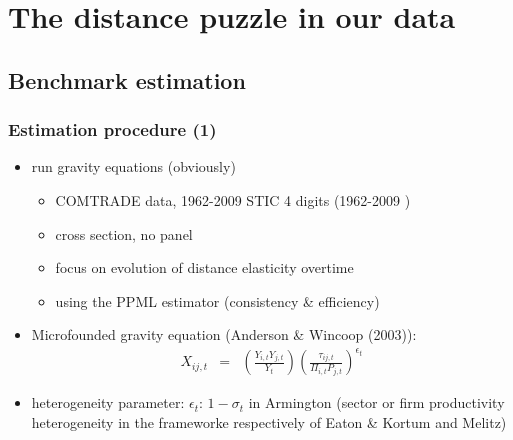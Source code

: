 \documentclass{beamer}
\begin{document}
\section{The distance puzzle in our data}
\subsection{Benchmark estimation}
\begin{frame}\frametitle{Estimation procedure (1)}
\begin{itemize}
	\item run gravity equations (obviously)
	\begin{itemize}
		\item COMTRADE data, 1962-2009 STIC 4 digits (1962-2009 )
		\item cross section, no panel
		\item focus on evolution of distance elasticity overtime
		\item using the PPML estimator (consistency \& efficiency)
	\end{itemize}
\item Microfounded gravity equation (Anderson \& Wincoop (2003)):
\begin{eqnarray}
X_{ij,t} & = & \left(\frac{Y_{i,t}Y_{j,t}}{Y_t}\right)\left(\frac{\tau_{ij,t}}{\Pi_{i,t}P_{j,t}}\right)^{\epsilon_t} \nonumber
\end{eqnarray}
\item heterogeneity parameter: $\epsilon_t$: $1-\sigma_{t}$ in Armington (sector or firm productivity heterogeneity in the frameworke respectively of Eaton \& Kortum and Melitz)
\end{itemize}
\end{frame}
\end{document}
